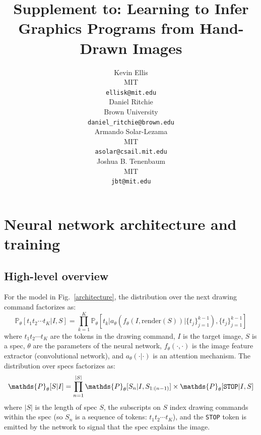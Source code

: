 \documentclass{article}
\title{Supplement to: Learning to Infer Graphics Programs from Hand-Drawn Images}
\author{
Kevin Ellis\\
  MIT\\
  \texttt{ellisk@mit.edu} \\
  \And
  Daniel Ritchie\\
Brown University\\
 \texttt{daniel\_ritchie@brown.edu} \\
 \AND
 Armando Solar-Lezama\\
 MIT\\
\texttt{asolar@csail.mit.edu} \\
\And
Joshua B. Tenenbaum \\
MIT\\
\texttt{jbt@mit.edu}
}
\newcommand{\probability}{\mathds{P}} %
\begin{document}

\maketitle

\section{Neural network architecture and training}

\subsection{High-level overview}

For the model in Fig.~\ref{architecture}, the distribution over the next drawing command factorizes as:
\begin{equation}
  \probability_\theta [t_1t_2\cdots t_K | I,S] = \prod_{k = 1}^K \probability_\theta \left[t_k | a_\theta \left(f_\theta(I,\text{render}(S)) | \{t_j\}_{j = 1}^{k - 1}\right), \{t_j\}_{j = 1}^{k - 1}\right]
\end{equation}
where $t_1t_2\cdots t_K$ are the tokens in the drawing command, $I$ is
the target image, $S$ is a spec, $\theta$ are the
parameters of the neural network, $f_\theta(\cdot,\cdot)$ is the
image feature extractor (convolutional network), and $a_\theta(\cdot|\cdot)$ is an attention mechanism. The distribution over
specs factorizes as:
\begin{equation}
  \probability_\theta [S|I] = \prod_{n = 1}^{|S|} \probability_\theta [S_n | I,S_{1:(n-1)}]\times\probability_\theta [\verb|STOP| | I,S]\label{objective}
\end{equation}
where $|S|$ is the length of spec $S$, the subscripts
on $S$ index drawing commands within the spec (so $S_n$ is a sequence of tokens: $t_1t_2\cdots t_K$), and the \verb|STOP|
token is emitted by the network to signal that the spec
explains the image.
\tikzset{>=latex}
\end{document}
